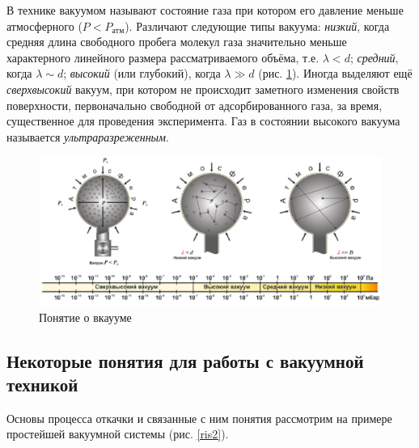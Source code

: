 \documentclass[a4paper, 12pt]{article}
\begin{document}
В технике вакуумом называют состояние газа при котором его
давление меньше атмосферного ($P < P_{атм}$). Различают следующие типы
вакуума: \textit{низкий}, когда средняя длина свободного пробега молекул газа
значительно меньше характерного линейного размера рассматриваемого
объёма, т.е. $\lambda < d$; \textit{средний}, когда $\lambda \sim d$; \textit{высокий} (или глубокий), когда
$\lambda \gg d$ (рис. \ref{ris1}). Иногда выделяют ещё \textit{сверхвысокий} вакуум, при котором
не происходит заметного изменения свойств поверхности, первоначально
свободной от адсорбированного газа, за время, существенное
для проведения эксперимента. Газ в состоянии высокого вакуума называется \textit{ультраразреженным}.

\begin{figure}[h!]
	\includegraphics[width = \textwidth]{1.png}
\caption{Понятие о вкаууме}
\label{ris1}
\end{figure}

\subsection{Некоторые понятия для работы с вакуумной техникой}

Основы процесса откачки и связанные с ним понятия рассмотрим на примере простейшей вакуумной системы (рис. \ref{ris2}).
\end{document}

